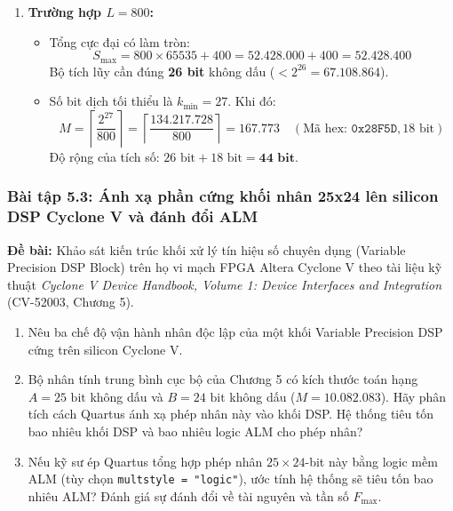 \begin{enumerate}[label=(\alph*)]
    \item \textbf{Trường hợp $L = 800$:}
    \begin{itemize}[leftmargin=1.5em, itemsep=2pt]
        \item Tổng cực đại có làm tròn:
        \begin{equation}
        S_{\text{max}} = 800 \times 65535 + 400 = 52.428.000 + 400 = 52.428.400
        \end{equation}
        Bộ tích lũy cần đúng \textbf{26 bit} không dấu ($< 2^{26} = 67.108.864$).
        \item Số bit dịch tối thiểu là $k_{\min} = 27$. Khi đó:
        \begin{equation}
        M = \left\lceil \frac{2^{27}}{800} \right\rceil = \left\lceil \frac{134.217.728}{800} \right\rceil = \mathbf{167.773} \quad (\text{Mã hex: } \texttt{0x28F5D}, 18\text{ bit})
        \end{equation}
        Độ rộng của tích số: $26\text{ bit} + 18\text{ bit} = \mathbf{44\text{ bit}}$.
    \end{itemize}
\end{enumerate}

\subsubsection*{Bài tập 5.3: Ánh xạ phần cứng khối nhân 25x24 lên silicon DSP Cyclone V và đánh đổi ALM}
\textbf{Đề bài:} Khảo sát kiến trúc khối xử lý tín hiệu số chuyên dụng (Variable Precision DSP Block) trên họ vi mạch FPGA Altera Cyclone V theo tài liệu kỹ thuật \emph{Cyclone V Device Handbook, Volume 1: Device Interfaces and Integration} (CV-52003, Chương 5).
\begin{enumerate}[label=(\alph*)]
    \item Nêu ba chế độ vận hành nhân độc lập của một khối Variable Precision DSP cứng trên silicon Cyclone V.
    \item Bộ nhân tính trung bình cục bộ của Chương 5 có kích thước toán hạng $A = 25\text{ bit}$ không dấu và $B = 24\text{ bit}$ không dấu ($M = 10.082.083$). Hãy phân tích cách Quartus ánh xạ phép nhân này vào khối DSP. Hệ thống tiêu tốn bao nhiêu khối DSP và bao nhiêu logic ALM cho phép nhân?
    \item Nếu kỹ sư ép Quartus tổng hợp phép nhân $25 \times 24$-bit này bằng logic mềm ALM (tùy chọn \texttt{multstyle = "logic"}), ước tính hệ thống sẽ tiêu tốn bao nhiêu ALM? Đánh giá sự đánh đổi về tài nguyên và tần số $F_{\max}$.
\end{enumerate}

